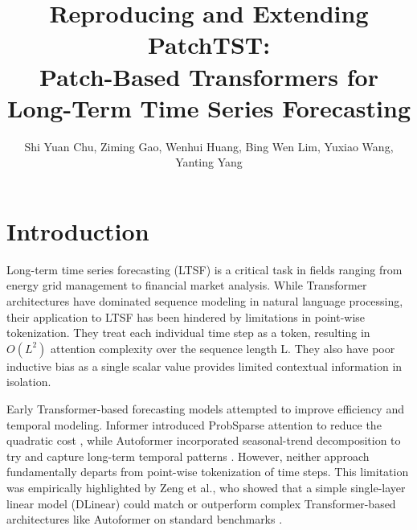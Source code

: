 \documentclass[11pt]{article}
\title{Reproducing and Extending PatchTST: \\
Patch-Based Transformers for Long-Term Time Series Forecasting}
\author{Shi Yuan Chu, Ziming Gao, Wenhui Huang, Bing Wen Lim, Yuxiao Wang, Yanting Yang}
\date{}
\begin{document}
\maketitle

\section{Introduction}

Long-term time series forecasting (LTSF) is a critical task in fields ranging from energy grid management to financial market analysis. While Transformer architectures have dominated sequence modeling in natural language processing, their application to LTSF has been hindered by limitations in point-wise tokenization.  They treat each individual time step as a token, resulting in $O(L^2)$ attention complexity over the sequence length L.  They also have poor inductive bias as a single scalar value provides limited contextual information in isolation.

Early Transformer-based forecasting models attempted to improve efficiency and temporal modeling. Informer introduced ProbSparse attention to reduce the quadratic cost \cite{informer}, while Autoformer incorporated seasonal-trend decomposition to try and capture long-term temporal patterns \cite{autoformer}. However, neither approach fundamentally departs from point-wise tokenization of time steps. This limitation was empirically highlighted by Zeng et al., who showed that a simple single-layer linear model (DLinear) could match or outperform complex Transformer-based architectures like Autoformer on standard benchmarks \cite{dlinear}.
\end{document}
